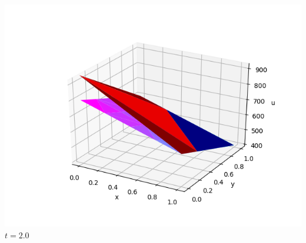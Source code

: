 \documentclass[]{beamer}
\begin{document}
\begin{frame}[t]
\begin{columns}
\begin{center}
			\includegraphics[scale=0.2]{figures/2D_xy_ls1m/2D_xy_ls1mat_u_vs_x_20}\\
			$t=2.0$
			\end{center}
	\end{columns}
\end{frame}
\end{document}
